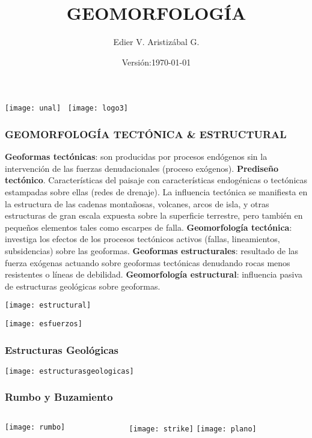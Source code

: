 \documentclass{beamer}
\title[Ambiente Estructural]{GEOMORFOLOGÍA}
\author[Edier Aristizabal]{Edier V. Aristizábal G.}
\institute{evaristizabalg@unal.edu.co}
\date{Versión:\today}
\begin{document}
\begin{frame}
\titlepage
\centering
	\texttt{[image: unal]}\hspace*{4.75cm}~%
   	\texttt{[image: logo3]} 
\end{frame}
\begin{frame}
\frametitle{GEOMORFOLOGÍA TECTÓNICA \& ESTRUCTURAL}
\justifying
\small{
\textbf{Geoformas tectónicas}: son producidas por procesos endógenos sin la intervención de las fuerzas denudacionales (proceso exógenos).\vfill
\textbf{Prediseño tectónico}. Características del paisaje con características endogénicas o tectónicas estampadas sobre ellas (redes de drenaje).\vfill
La influencia tectónica se manifiesta en la estructura de las cadenas montañosas, volcanes, arcos de isla, y otras estructuras de gran escala expuesta sobre la superficie terrestre, pero también en pequeños elementos tales como escarpes de falla.\vfill
\textbf{Geomorfología tectónica}: investiga los efectos de los procesos tectónicos activos (fallas, lineamientos, subsidencias) sobre las geoformas.\vfill
\textbf{Geoformas estructurales}: resultado de las fuerza exógenas actuando sobre geoformas tectónicas denudando rocas menos resistentes o líneas de debilidad.\vfill
\textbf{Geomorfología estructural}: influencia pasiva de estructuras geológicas sobre geoformas.}\\
\begin{center}
\texttt{[image: estructural]}
\end{center}
\end{frame}
\begin{frame}
\begin{center}
\texttt{[image: esfuerzos]}
\end{center}
\end{frame}
\begin{frame}
\frametitle{Estructuras Geológicas}
\begin{center}
\texttt{[image: estructurasgeologicas]}
\end{center}
\end{frame}
\begin{frame}
\frametitle{Rumbo y Buzamiento}
\centering
\begin{columns}
	\begin{column}{.5\linewidth}
	\texttt{[image: rumbo]}
	\end{column}
	\begin{column}{.5\linewidth}
	\texttt{[image: strike]}\vfill
	\texttt{[image: plano]}
	\end{column}
\end{columns}
\end{frame}
\end{document}
